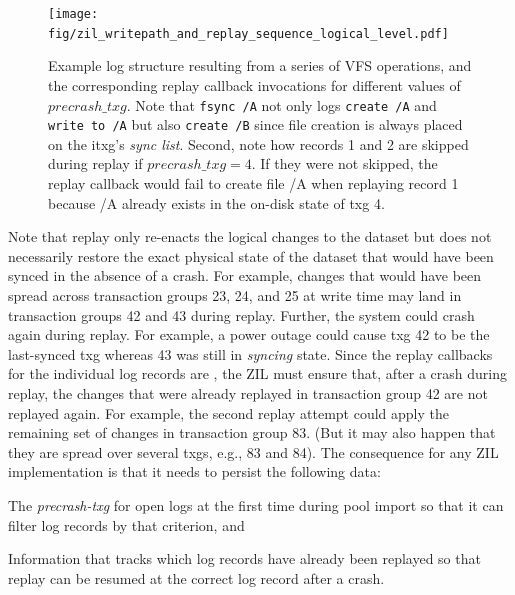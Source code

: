 \documentclass[12pt,a4paper,twoside]{book}
\begin{document}
\begin{figure}[H]
    \centering
    \texttt{[image: fig/zil\_writepath\_and\_replay\_sequence\_logical\_level.pdf]}
    \caption{
        Example log structure resulting from a series of VFS operations, and the corresponding replay callback invocations for different values of $precrash\_txg$.
        Note that \lstinline{fsync /A} not only logs \lstinline{create /A} and \lstinline{write to /A} but also \lstinline{create /B} since file creation is always placed on the itxg's \textit{sync list}.
        Second, note how records 1 and 2 are skipped during replay if $precrash\_txg = 4$.
        If they were not skipped, the replay callback would fail to create file /A when replaying record 1 because /A already exists in the on-disk state of txg 4.
    }
    \label{fig:zil_writepath_and_replay_sequence_logical_level}
\end{figure}

Note that replay only re-enacts the logical changes to the dataset but does not necessarily restore the exact physical state of the dataset that would have been synced in the absence of a crash.
For example, changes that would have been spread across transaction groups 23, 24, and 25 at write time may land in transaction groups 42 and 43 during replay.
Further, the system could crash again during replay.
For example, a power outage could cause txg 42 to be the last-synced txg whereas 43 was still in \textit{syncing} state.
Since the replay callbacks for the individual log records are \underline{}, the ZIL must ensure that, after a crash during replay, the changes that were already replayed in transaction group 42 are not replayed again.
For example, the second replay attempt could apply the remaining set of changes in transaction group 83.
(But it may also happen that they are spread over several txgs, e.g., 83 and 84).
The consequence for any ZIL implementation is that it needs to persist the following data:
\begin{description}[noitemsep,leftmargin=1.5cm,labelindent=1cm]
    \item[Precrash-txg] The \textit{precrash-txg} for open logs at the first time during pool import so that it can filter log records by that criterion, and
    \item[Replay progress] Information that tracks which log records have already been replayed so that replay can be resumed at the correct log record after a crash.
\end{description}
\end{document}
